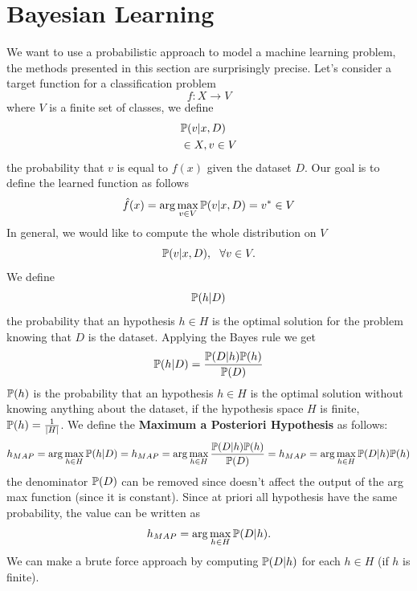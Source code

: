 \documentclass[10pt, letterpaper]{report}
\begin{document}
\section{Bayesian Learning}
We want to use a probabilistic approach to model a machine learning problem, the methods presented in this section are surprisingly precise. Let's consider a target function for a classification problem\begin{equation}
	f:X\rightarrow V
\end{equation}
where $V$ is a finite set of classes, we define \begin{align}
	 & {\mathbb P}(v|x,D) \\ &\in X, v\in V
\end{align}
the probability that $v$ is equal to $f(x)$ given the dataset $D$. Our goal is to define the learned function as follows\begin{equation}
	\hat f(x)=\arg\max_{v\in V}{\mathbb P}(v|x,D)=v^*\in V
\end{equation}
In general, we would like to compute the whole distribution on $V$\begin{equation}
	{\mathbb P}(v|x,D), \ \ \forall v\in V.
\end{equation}
We define\begin{equation}
	{\mathbb P}(h|D)
\end{equation}
the probability that an hypothesis $h\in H$ is the optimal solution for the problem knowing that $D$ is the dataset. Applying the Bayes rule we get\begin{equation}
	{\mathbb P}(h|D)=\frac{{\mathbb P}(D|h){\mathbb P}(h)}{{\mathbb P}(D)}
\end{equation}
${\mathbb P}(h)$ is the probability that an hypothesis $h\in H$ is the optimal solution without knowing anything about the dataset, if the hypothesis space  $H$ is finite, ${\mathbb P}(h)=\frac{1}{|H|}$. We define the \textbf{Maximum a Posteriori Hypothesis} as follows:\begin{equation}
	h_{MAP}=\arg\max_{h\in H}{\mathbb P}(h|D)= h_{MAP}=\arg\max_{h\in H}\frac{{\mathbb P}(D|h){\mathbb P}(h)}{{\mathbb P}(D)}= h_{MAP}=\arg\max_{h\in H}{\mathbb P}(D|h){\mathbb P}(h)
\end{equation}
the denominator ${\mathbb P}(D)$ can be removed since doesn't affect the output of the arg max function (since it is constant). Since at priori all hypothesis have the same probability, the value can be written as\begin{equation}
	h_{MAP}=\arg\max_{h\in H}{\mathbb P}(D|h).
\end{equation}
We can make a brute force approach by computing ${\mathbb P}(D|h)$ for each $h\in H$ (if $h$ is finite).
\end{document}
